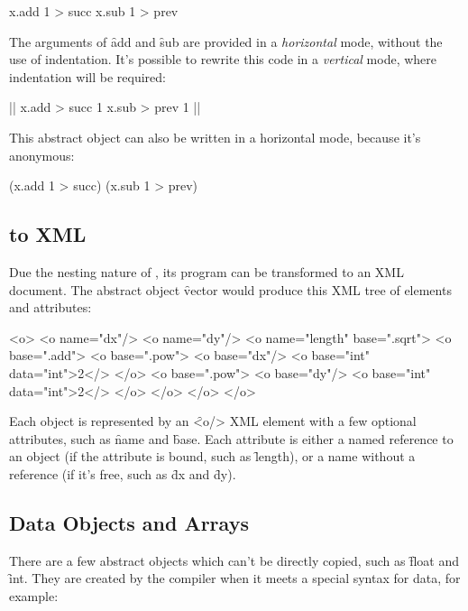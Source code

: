 \begin{eocode}
[x]
  x.add 1 > succ
  x.sub 1 > prev
\end{eocode}

The arguments of \f{add} and \f{sub} are provided in a \emph{horizontal}
mode, without the use of indentation. It's possible to rewrite this code
in a \emph{vertical} mode, where indentation will be required:

\begin{eocode}
[x] |$\label{ln:succ}$|
  x.add > succ
    1
  x.sub > prev
    1 |$\label{ln:succ-end}$|
\end{eocode}

This abstract object can also be written in a horizontal mode,
because it's anonymous:

\begin{eocode}
[x] (x.add 1 > succ) (x.sub 1 > prev)
\end{eocode}

\subsection{\eo{} to XML}\label{sec:xml}

Due the nesting nature of \eo{}, its program can be transformed
to an XML document. The abstract object \f{vector} would produce
this XML tree of elements and attributes:

\begin{eocode}
<o>
  <o name="dx"/>
  <o name="dy"/>
  <o name="length" base=".sqrt">
    <o base=".add">
      <o base=".pow">
        <o base="dx"/>
        <o base="int" data="int">2</>
      </o>
      <o base=".pow">
        <o base="dy"/>
        <o base="int" data="int">2</>
      </o>
    </o>
  </o>
</o>
\end{eocode}

Each object is represented by an \f{<o/>} XML element with a few
optional attributes, such as \f{name} and \f{base}. Each
attribute is either a named reference to an object (if the attribute is bound,
such as \f{length}), or a name without a reference (if it's free,
such as \f{dx} and \f{dy}).

\subsection{Data Objects and Arrays}

There are a few abstract objects which can't be directly copied, such as
\f{float} and \f{int}. They are created by the compiler when it meets
a special syntax for data, for example:

